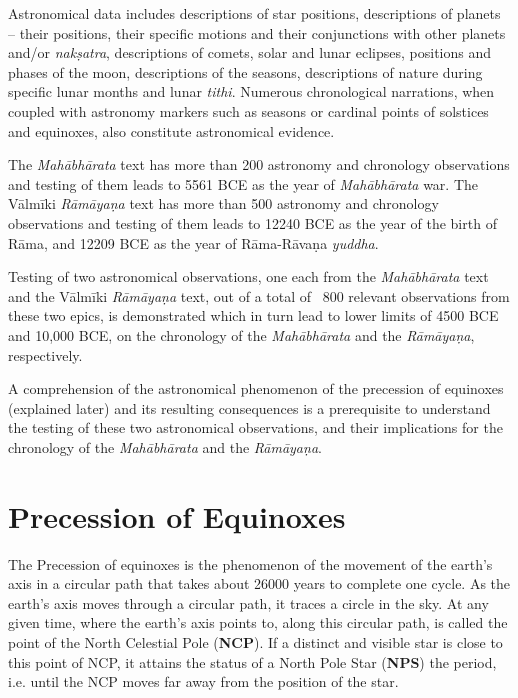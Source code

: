 Astronomical data includes descriptions of star positions, descriptions of planets – their positions, their specific motions and their conjunctions with other planets and/or \textit{nakṣatra}, descriptions of comets, solar and lunar eclipses, positions and phases of the moon, descriptions of the seasons, descriptions of nature during specific lunar months and lunar \textit{tithi}. Numerous chronological narrations, when coupled with astronomy markers such as seasons or cardinal points of solstices and equinoxes, also constitute astronomical evidence.

The \textit{Mahābhārata} text has more than 200 astronomy and chronology observations and testing of them leads to 5561 BCE as the year of \textit{Mahābhārata} war. The Vālmīki \textit{Rāmāyaṇa} text has more than 500 astronomy and chronology observations and testing of them leads to 12240 BCE as the year of the birth of Rāma, and 12209 BCE as the year of Rāma-Rāvaṇa \textit{yuddha}.

Testing of two astronomical observations, one each from the \textit{Mahābhārata} text and the Vālmīki \textit{Rāmāyaṇa} text, out of a total of ~800 relevant observations from these two epics, is demonstrated which in turn lead to lower limits of 4500 BCE and 10,000 BCE, on the chronology of the \textit{Mahābhārata} and the \textit{Rāmāyaṇa}, respectively.

A comprehension of the astronomical phenomenon of the precession of equinoxes (explained later) and its resulting consequences is a prerequisite to understand the testing of these two astronomical observations, and their implications for the chronology of the \textit{Mahābhārata} and the \textit{Rāmāyaṇa}.

\vspace{-.3cm}

\section*{Precession of Equinoxes}

The Precession of equinoxes is the phenomenon of the movement of the earth’s axis in a circular path that takes about 26000 years to complete one cycle. As the earth’s axis moves through a circular path, it traces a circle in the sky. At any given time, where the earth’s axis points to, along this circular path, is called the point of the North Celestial Pole (\textbf{NCP}). If a distinct and visible star is close to this point of NCP, it attains the status of a North Pole Star (\textbf{NPS}) the period, i.e. until the NCP moves far away from the position of the star.

